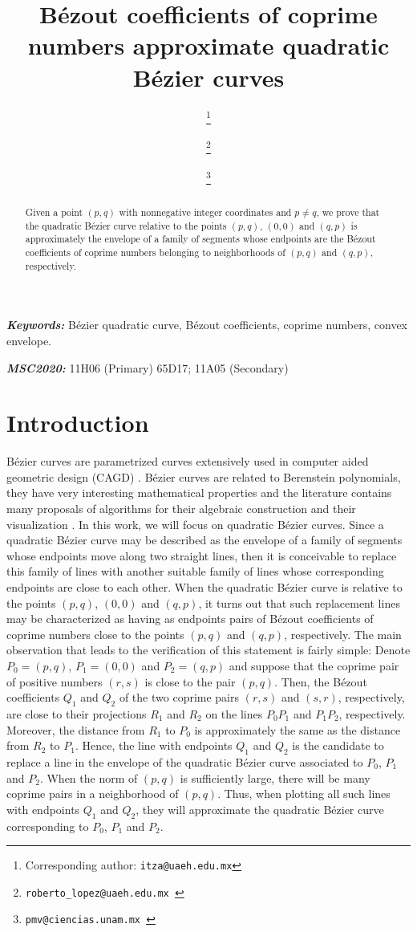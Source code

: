 \documentclass[12pt,english]{article}
\title{B\'ezout coefficients of coprime numbers approximate quadratic B\'ezier curves}
\author[1]{\sc{Benjam\'in A.~Itz\'a-Ortiz} \thanks{Corresponding author: {\tt itza@uaeh.edu.mx}}}
\author[1]{\sc{Roberto L\'opez-Hern\'andez}\footnote{\tt roberto\_lopez@uaeh.edu.mx }}
\author[2]{\sc{Pedro Miramontes}\footnote{\tt pmv@ciencias.unam.mx }}
\affil[1]{{\small{Centro de Investigaci\'on en Matem\'aticas, Universidad Aut\'onoma del Estado de Hidalgo, Pachuca, Hidalgo, \sc{Mexico}}}}
\affil[2]{{\small{Facultad de Ciencias, Universidad Nacional Aut\'onoma de M\'exico, Mexico City, \sc{Mexico}}}}
\date{}
\providecommand{\keywords}[1]{\textbf{\textit{Keywords:}} #1}
\providecommand{\msc}[1]{\textbf{\textit{MSC2020:}} #1}
\begin{document}
\maketitle

\begin{abstract}
   Given a point $(p,q)$ with  nonnegative integer coordinates and $p\not=q$,  we prove that the quadratic B\'ezier curve relative to the points $(p,q)$, $(0,0)$ and $(q,p)$ is approximately the envelope of a family of segments whose endpoints are the B\'ezout coefficients of  coprime numbers belonging to neighborhoods of  $(p,q)$ and $(q,p)$, respectively. 
\end{abstract}

\keywords{B\'ezier quadratic curve, B\'ezout coefficients, coprime numbers, convex envelope.}

\msc{11H06 (Primary) 65D17; 11A05 (Secondary)}
\section*{Introduction}
B\'ezier curves are parametrized curves extensively used in computer aided geometric design (CAGD) \cite{Mortenson}. B\'ezier curves are related to Berenstein polynomials, they have very interesting mathematical properties and the literature contains many proposals of algorithms for their algebraic construction and their visualization \cite{Farin,winkel}. In this work, we will focus on quadratic B\'ezier curves. Since a quadratic B\'ezier curve  may be described as the envelope of a family of segments whose endpoints move along  two straight lines, then it is conceivable to replace this family of lines with another suitable family of lines whose corresponding endpoints are close to each other. When the quadratic B\'ezier curve is relative to the points $(p,q)$, $(0,0)$ and $(q,p)$, it turns out that such replacement lines may be characterized as having as endpoints pairs of B\'ezout coefficients of coprime numbers close to the points  $(p,q)$ and $(q,p)$, respectively. The main observation that leads to the verification of this statement  is fairly simple: Denote $P_0=(p,q)$, $P_1=(0,0)$ and $P_2=(q,p)$ and suppose that the coprime pair of positive numbers $(r,s)$ is close to the pair $(p,q)$. Then,  the B\'ezout coefficients $Q_1$ and $Q_2$ of the two coprime pairs  $(r,s)$ and $(s,r)$, respectively, are close to their projections $R_1$ and $R_2$ on the lines $P_0P_1$ and $P_1P_2$, respectively. Moreover, the distance from $R_1$ to $P_0$ is approximately the same as the distance from $R_2$ to $P_1$. Hence, the line with endpoints $Q_1$ and $Q_2$ is the candidate to replace a line in the envelope of the quadratic B\'ezier curve associated to $P_0$, $P_1$ and $P_2$. When the norm of $(p,q)$ is sufficiently large, there will be many coprime pairs in a neighborhood of $(p,q)$. Thus, when plotting all such lines with endpoints $Q_1$ and $Q_2$, they will approximate the quadratic B\'ezier curve corresponding to $P_0$, $P_1$ and $P_2$.
\end{document}
